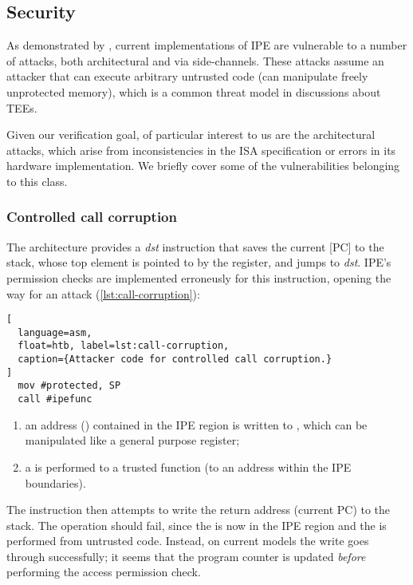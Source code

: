 \subsection{Security}
\label{sec:ipe-attacks}

As demonstrated by \cite{Bognar2024}, current implementations of IPE are vulnerable to a number of attacks, both architectural and via side-channels. These attacks assume an attacker that can execute arbitrary untrusted code (\ie can manipulate freely unprotected memory), which is a common threat model in discussions about TEEs. %

Given our verification goal, of particular interest to us are the architectural attacks, which arise from inconsistencies in the ISA specification or errors in its hardware implementation. We briefly cover some of the vulnerabilities belonging to this class.

\subsubsection{Controlled call corruption}
\label{sec:call-corruption}

The \msp architecture provides a  \emph{dst} instruction that saves the current [PC] to the stack, whose top element is pointed to by the  register, and jumps to \emph{dst}. IPE's permission checks are implemented erroneusly for this instruction, opening the way for an attack (\cref{lst:call-corruption}):

\begin{lstlisting}[
  language=asm,
  float=htb, label=lst:call-corruption,
  caption={Attacker code for controlled call corruption.}
]
  mov #protected, SP
  call #ipefunc
\end{lstlisting}

\begin{enumerate}
\item an address () contained in the IPE region is written to , which can be manipulated like a general purpose register;
\item a  is performed to a trusted function (\ie to an address  within the IPE boundaries).
\end{enumerate}

The  instruction then attempts to write the return address (current PC) to the stack. The operation should fail, since the  is now in the IPE region and the  is performed from untrusted code. Instead, on current models the write goes through successfully; it seems that the program counter is updated \emph{before} performing the access permission check.

